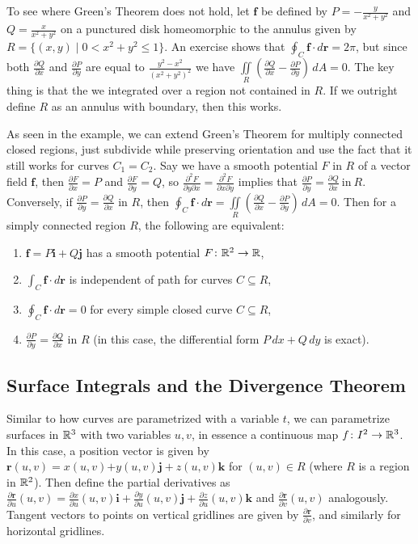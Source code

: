 \begin{example}
    To see where Green's Theorem does not hold, let $\mathbf f$ be defined by $P=-\frac{y}{x^2+y^2}$ and $Q=\frac{x}{x^2+y^2}$ on a punctured disk homeomorphic to the annulus given by $R= \{(x,y) \mid 0<x^2+y^2\leq 1\} $. An exercise shows that $\oint_C \mathbf f\cdot d\mathbf r=2\pi$, but since both $\frac{\partial Q}{\partial x}$ and $\frac{\partial P}{\partial y}$ are equal to $\frac{y^2-x^2}{(x^2+y^2)^2}$ we have $\iint\limits_R \left( \frac{\partial Q}{\partial x}-\frac{\partial P}{\partial y} \right) \,dA=0$. The key thing is that the we integrated over a region not contained in $R$. If we outright define $R$ as an annulus with boundary, then this works.
\end{example}
As seen in the example, we can extend Green's Theorem for multiply connected closed regions, just subdivide while preserving orientation and use the fact that it still works for curves $C_1=C_2$. Say we have a smooth potential $F$ in $R$ of a vector field $\mathbf f$, then $\frac{\partial F}{\partial x}=P$ and $\frac{\partial F}{\partial y}=Q$, so $\frac{\partial ^2F}{\partial y\partial x}=\frac{\partial ^2F}{\partial x\partial y}$ implies that $\frac{\partial P}{\partial y}=\frac{\partial Q}{\partial x} \ \text{in} \ R.$ Conversely, if $\frac{\partial P}{\partial y}=\frac{\partial Q}{\partial x}$ in $R$, then $\oint_{C}^{} \mathbf f\cdot d\mathbf r=\iint\limits_R \left( \frac{\partial Q}{\partial x}-\frac{\partial P}{\partial y} \right) \, dA=0.$ Then for a simply connected region $R$, the following are equivalent: 
\begin{enumerate}[label=(\alph*)]
    \item $\mathbf f=P\mathbf i+Q\mathbf j$ has a smooth potential $F \colon \mathbb{R}^2 \to \mathbb{R}$, 
    \item $\int_{C}^{} \mathbf f\cdot d\mathbf r$ is independent of path for curves $C\subseteq R$, 
    \item $\oint_{C}^{} \mathbf f \cdot d\mathbf r=0$ for every simple closed curve $C\subseteq R$,
    \item $\frac{\partial P}{\partial y}=\frac{\partial Q}{\partial x}$ in $R$ (in this case, the differential form $P \, dx + Q\, dy$ is exact).
\end{enumerate}

\subsection{Surface Integrals and the Divergence Theorem}
Similar to how curves are parametrized with a variable $t$, we can parametrize surfaces in $\mathbb{R}^3$ with two variables $u,v$, in essence a continuous map $f \colon I^2 \to \mathbb{R}^3$. In this case, a position vector is given by $\mathbf r(u,v)=x(u,v)\mathbf +y(u,v) \mathbf j+ z(u,v) \mathbf k$ for $(u,v)\in R$ (where $R$ is a region in $\mathbb{R}^2$). Then define the partial derivatives as $\frac{\partial \mathbf r}{\partial u}(u,v)=\frac{\partial x}{\partial u}(u,v)\mathbf i+\frac{\partial y}{\partial u}(u,v)\mathbf j+\frac{\partial z}{\partial u}(u,v)\mathbf k$ and $\frac{\partial \mathbf r}{\partial v}(u,v)$ analogously. Tangent vectors to points on vertical gridlines are given by $\frac{\partial \mathbf r}{\partial v}$, and similarly for horizontal gridlines.

